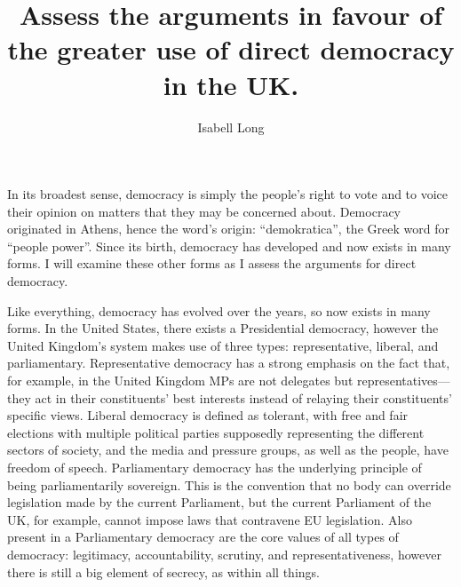 \documentclass[12pt,a4paper]{article}
\begin{document}
\title{Assess the arguments in favour of the greater use of direct democracy in the UK.}
\author{Isabell Long}
\maketitle

In its broadest sense, democracy is simply the people's right to vote and to voice their opinion on matters that they may be concerned about.  Democracy originated in Athens, hence the word's origin: ``demokratica'', the Greek word for ``people power''.  Since its birth, democracy has developed and now exists in many forms.  I will examine these other forms as I assess the arguments for direct democracy.

Like everything, democracy has evolved over the years, so now exists in many forms.  In the United States, there exists a Presidential democracy, however the United Kingdom's system makes use of three types: representative, liberal, and parliamentary.  Representative democracy has a strong emphasis on the fact that, for example, in the United Kingdom MPs are not delegates but representatives---they act in their constituents' best interests instead of relaying their constituents' specific views.  Liberal democracy is defined as tolerant, with free and fair elections with multiple political parties supposedly representing the different sectors of society, and the media and pressure groups, as well as the people, have freedom of speech.  Parliamentary democracy has the underlying principle of being parliamentarily sovereign.  This is the convention that no body can override legislation made by the current Parliament, but the current Parliament of the UK, for example, cannot impose laws that contravene EU legislation.  Also present in a Parliamentary democracy are the core values of all types of democracy: legitimacy, accountability, scrutiny, and representativeness, however there is still a big element of secrecy, as within all things.
\end{document}
